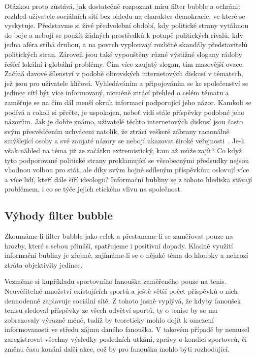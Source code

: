 \documentclass[12pt, a4paper]{article}
\numberwithin{equation}{section} 	%
\begin{document}
Otázkou proto zůstává, jak dostatečně rozpoznat míru filter bubble a ochránit rozhled uživatele sociálních sítí bez ohledu na charakter demokracie, ve které se vyskytuje. Představme si živé předvolební období, kdy politické strany vytáhnou do boje a nebojí se použít žádných prostředků k potupě politických rivalů, kdy jedna aféra stíhá druhou, a na povrch vyplouvají rozličné skandály představitelů politických stran. Zároveň jsou také vypouštěny různé výstižné slogany rádoby řešící lokální i globální problémy. Čím více zaujatý slogan, tím masovější ovace. Začíná davové šílenství v podobě obrovských internetových diskusí v tématech, jež jsou pro uživatele klíčová. Vyhledáváním a připojováním se ke společenství se jedinec cítí být více informovaný, nicméně ztrácí přehled o celém tématu a zaměřuje se na čím dál menší okruh informací podporující jeho názor. Kamkoli se podívá a cokoli si přečte, je uspokojen, neboť vidí stále příspěvky podobné jeho názorům. Jak je dobře známo, uživatelé těchto internetových diskusí jsou často svým přesvědčením uchváceni natolik, že ztrácí veškeré zábrany racionálně smýšlející osoby a své zaujaté názory se nebojí ukazovat široké veřejnosti~\cite{DemocracyOnline}. Je-li však náhled na téma již ze začátku extremistický, kam až může zajít? Co když tyto podporované politické strany proklamující se všeobecnými předsudky nejsou vhodnou volbou pro stát, ale díky svým hojně sdíleným příspěvkům oslovují více a více lidí, kteří dále šíří ideologii? Informační bubliny se z tohoto hlediska stávají problémem, i co se týče jejich etického vlivu na společnost.


\subsection{Výhody filter bubble}
\noindent Zkoumáme-li filter bubble jako celek a přestaneme-li se zaměřovat pouze na hrozby, které s sebou přináší, spatřujeme i positivní dopady. Kladné využití informační bubliny je zřejmé, zajímáme-li se o nějaké téma do hloubky a nehrozí ztráta objektivity jedince.

Vezměme si kupříkladu sportovního fanouška zaměřeného pouze na tenis. Neuvěřitelné množství existujících sportů a ještě větší počet příspěvků o nich dennodenně zaplavuje sociální sítě. Z tohoto jasně vyplývá, že kdyby fanoušek tenisu sledoval příspěvky ze všech odvětví sportů, ty o tenise by se mu zobrazovaly výrazně méně, tudíž by teoreticky mohlo dojít k omezení informovanosti ve středu zájmu daného fanouška. V takovém případě by nemusel zaregistrovat všechny výsledky posledních utkání, zprávy o kondici sportovců, či změnu času konání další akce, což by pro fanouška mohlo býti rozhodující.
\end{document}
